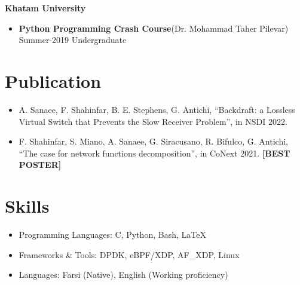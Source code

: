 \documentclass[11pt]{article}
\newcommand*{\taRecord}[4]{\textbf{#1}\quad (#3) \\ #2 \quad  #4}
\begin{document}
{
\renewcommand\labelitemi{}
\noindent \textbf{Khatam University} \par
\begin{itemize}[noitemsep,topsep=0pt,parsep=0pt,partopsep=0pt]
	\item \taRecord{Python Programming Crash Course}
		{Summer-2019}
		{Dr. Mohammad Taher Pilevar}
		{Undergraduate}
\end{itemize}
}

\section {Publication}
\begin{itemize}
    \item A. Sanaee, F. Shahinfar, B. E. Stephens, G. Antichi, ``Backdraft: a Lossless Virtual Switch that
        Prevents the Slow Receiver Problem'', in NSDI 2022.

    \item F. Shahinfar, S. Miano, A. Sanaee, G. Siracusano, R. Bifulco, G. Antichi,
        ``The case for network functions decomposition'', in CoNext 2021. \textbf{[BEST POSTER]}
\end{itemize}

\section{Skills}
\begin{itemize}[noitemsep,topsep=0pt,parsep=0pt,partopsep=0pt]
	\item {Programming Languages: C, Python, Bash, \LaTeX}
	\item {Frameworks \& Tools: DPDK, eBPF/XDP, AF\_XDP, Linux}
	\item {Languages: Farsi (Native), English (Working proficiency)}
\end{itemize}

\end{document}
